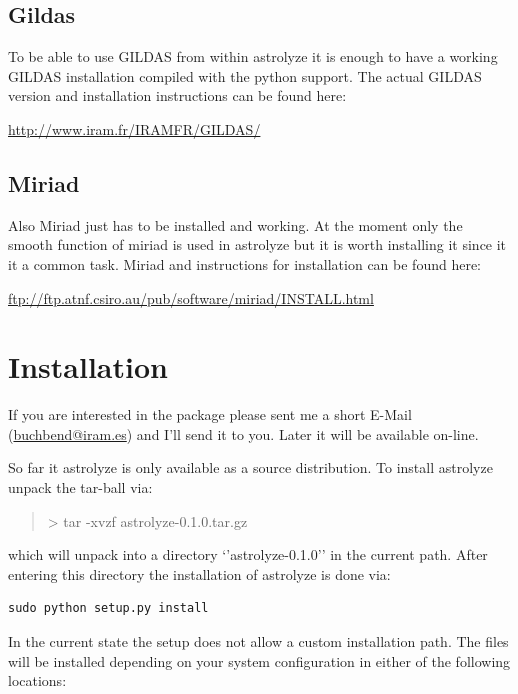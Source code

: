 \documentclass[a4paper,10pt,english]{sphinxmanual}
\begin{document}
\subsection{Gildas}
\label{installation:gildas}
To be able to use GILDAS from within astrolyze it is enough to have a working
GILDAS installation compiled with the python support. The actual GILDAS version
and installation instructions can be found here:

\href{http://www.iram.fr/IRAMFR/GILDAS/}{http://www.iram.fr/IRAMFR/GILDAS/}


\subsection{Miriad}
\label{installation:miriad}
Also Miriad just has to be installed and working. At the moment only the smooth
function of miriad is used in astrolyze but it is worth installing it since it
it a common task. Miriad and instructions for installation can be found here:

\href{ftp://ftp.atnf.csiro.au/pub/software/miriad/INSTALL.html}{ftp://ftp.atnf.csiro.au/pub/software/miriad/INSTALL.html}


\section{Installation}
\label{installation:installation}
If you are interested in the package please sent me a short E-Mail
(\href{mailto:buchbend@iram.es}{buchbend@iram.es}) and I'll send it to you. Later it will be available on-line.

So far it astrolyze is only available as a source distribution. To install
astrolyze unpack the tar-ball via:
\begin{quote}

\textgreater{} tar -xvzf astrolyze-0.1.0.tar.gz
\end{quote}

which will unpack into a directory `'astrolyze-0.1.0'' in the current path.
After entering this directory the installation of astrolyze is done via:

\begin{Verbatim}[commandchars=\\\{\}]
sudo python setup.py install
\end{Verbatim}

In the current state the setup does not allow a custom installation path. The
files will be installed depending on your system configuration in either of the
following locations:
\end{document}
